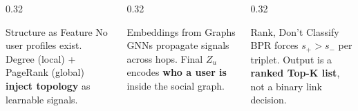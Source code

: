\documentclass[10pt,aspectratio=43]{beamer}
\begin{document}
\begin{frame}
\begin{center}
\begin{tikzpicture}[node distance=0.45cm]
\end{tikzpicture}
\end{center}

\vspace{0.1em}

\begin{columns}[T]
\begin{column}{0.32\textwidth}
\begin{block}{\scriptsize\centering Structure as Feature}
\scriptsize No user profiles exist.
Degree (local) + PageRank (global) \textbf{inject topology} as learnable signals.
\end{block}
\end{column}
\begin{column}{0.32\textwidth}
\begin{block}{\scriptsize\centering Embeddings from Graphs}
\scriptsize GNNs propagate signals across hops.
Final $Z_u$ encodes \textbf{who a user is} inside the social graph.
\end{block}
\end{column}
\begin{column}{0.32\textwidth}
\begin{block}{\scriptsize\centering Rank, Don't Classify}
\scriptsize BPR forces $s_+ > s_-$ per triplet.
Output is a \textbf{ranked Top-K list}, not a binary link decision.
\end{block}
\end{column}
\end{columns}

\end{frame}
\end{document}
